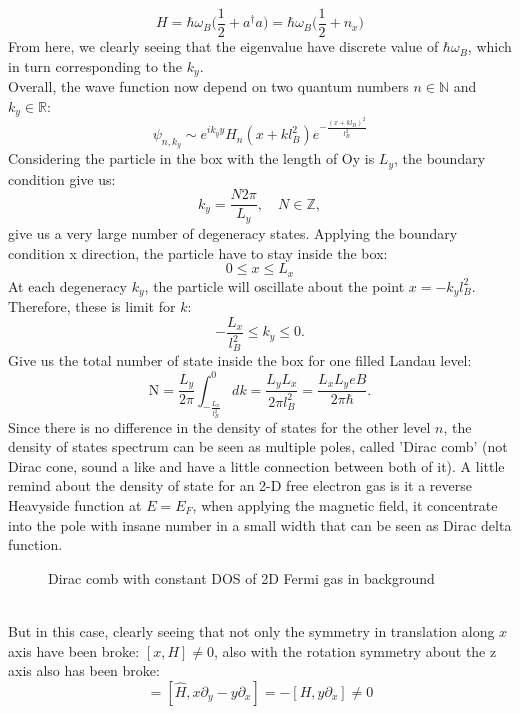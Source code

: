 \documentclass[unnumsec,webpdf,modern,large]{mam-authoring-template}%
\theoremstyle{thmstyleone}%
\theoremstyle{thmstyletwo}%
\theoremstyle{thmstylethree}%
\begin{document}
\begin{appendices}
\begin{equation}\label{Landau Level Hamiltonian}
	H = \hbar\omega_B \bigg(\frac{1}{2} + a^\dagger a\bigg) = \hbar\omega_B \bigg(\frac{1}{2} + n_x\bigg)
\end{equation}
\quad From here, we clearly seeing that the eigenvalue have discrete value of \(\hbar \omega_B\), which in turn corresponding to the \(k_y\).\\\null
\quad Overall, the wave function now depend on two quantum numbers \(n \in \mathbb{N}\) and \(k_y \in \mathbb{R}\):
\begin{equation*}
	\psi_{n,k_y} \sim e^{ik_y y} H_n(x + kl_B^2) e^{-\frac{(x+ k l_B)^2}{l_B^2}}
\end{equation*}
\quad Considering the particle in the box with the length of Oy is \(L_y\), the boundary condition give us:
\begin{equation}\label{k_y BC}
	k_y = \frac{N2\pi}{L_y},\quad N \in \mathbb{Z},
\end{equation}
give us a very large number of degeneracy states. Applying the boundary condition x direction, the particle have to stay inside the box:
\begin{equation*}
	0\leq x \leq L_x
\end{equation*}
At each degeneracy \(k_y\), the particle will oscillate about the point \(x = -k_y l_B^2\). Therefore, these is limit for \(k\):
\begin{equation*}
	-\frac{L_x}{l_B^2}\leq k_y \leq 0.
\end{equation*}
Give us the total number of state inside the box for one filled Landau level:
\begin{equation} \label{degen ky}
	\mathrm{N} = \frac{L_y}{2\pi}\int_{-\frac{L_x}{l_B^2}}^0 dk = \frac{L_y L_x}{2\pi l_B^2} = \frac{L_x L_y eB}{2\pi \hbar}.
\end{equation}
\quad Since there is no difference in the density of states for the other level \(n\), the density of states spectrum can be seen as multiple poles, called 'Dirac comb' (not Dirac cone, sound a like and have a little connection between both of it). A little remind about the density of state for an 2-D free electron gas is it a reverse Heavyside function at \(E = E_F\), when applying the magnetic field, it concentrate into the pole with insane number in a small width that can be seen as Dirac delta function.
\begin{figure}[!ht]
\centering

\vspace{-1.3cm}
\caption{Dirac comb with constant DOS of 2D Fermi gas in background}
\end{figure}\\\null
\quad But in this case, clearly seeing that not only the symmetry in translation along \(x\) axis have been broke: \([x,H] \neq 0\), also with the rotation symmetry about the z axis also has been broke:
\begin{equation}
	[\hat{H}, \hat{L}_z] = [\hat{H}, x \partial_y - y\partial_x] = - [H, y\partial_x] \neq 0
\end{equation}

\end{appendices}
\end{document}
